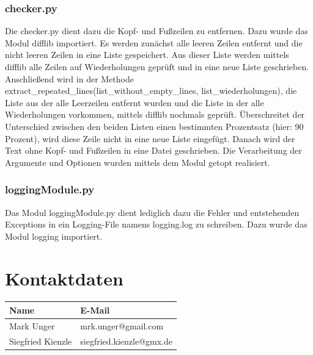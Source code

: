 \documentclass[12pt]{scrartcl}
\begin{document}
\subsubsection{checker.py}
\label{sec:technical-background-checker}
Die checker.py dient dazu die Kopf- und Fußzeilen zu entfernen. Dazu wurde das Modul difflib importiert. Es werden zunächst alle leeren Zeilen entfernt und die nicht leeren Zeilen in eine Liste gespeichert. Aus dieser Liste werden mittels difflib alle Zeilen auf Wiederholungen geprüft und in eine neue Liste geschrieben. Anschließend wird in der Methode extract\_repeated\_lines(list\_without\_empty\_lines, list\_wiederholungen), die Liste aus der alle Leerzeilen entfernt wurden und die Liste in der alle Wiederholungen vorkommen, mittels difflib nochmals geprüft. Überschreitet der Unterschied zwischen den beiden Listen einen bestimmten Prozentsatz (hier: 90 Prozent), wird diese Zeile nicht in eine neue Liste eingefügt. Danach wird der Text ohne Kopf- und Fußzeilen in eine Datei geschrieben. 
Die Verarbeitung der Argumente und Optionen wurden mittels dem Modul getopt realisiert.
\subsubsection{loggingModule.py}
\label{sec:technical-background-loggingModule}
Das Modul loggingModule.py dient lediglich dazu die Fehler und entstehenden Exceptions in ein Logging-File namens logging.log zu schreiben. Dazu wurde das Modul logging importiert. 
\newpage
\section{Kontaktdaten}
\label{sec:kontaktdaten}
\begin{table}[H]
\label{kontaktdaten}
\begin{tabular}{|l|l|}
\hline
\rowcolor[HTML]{9B9B9B} 
Name              & E-Mail                   \\ \hline
Mark Unger        & mrk.unger@gmail.com      \\ \hline
Siegfried Kienzle & siegfried.kienzle@gmx.de \\ \hline
\end{tabular}
\end{table}
\end{document}
